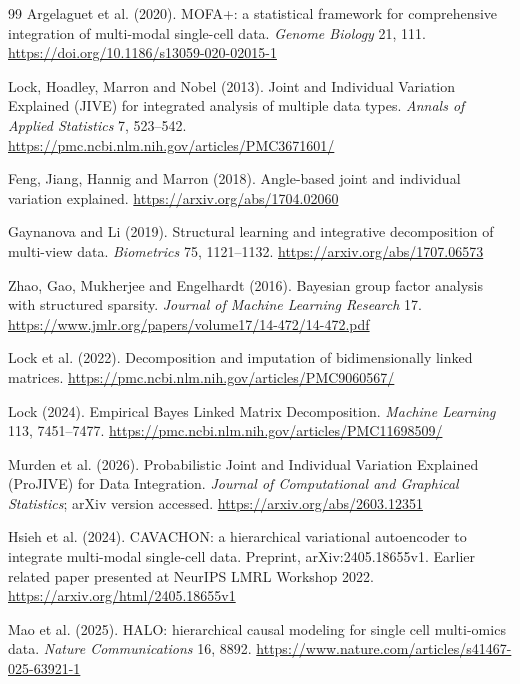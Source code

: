 \documentclass[11pt,a4paper]{article}
\numberwithin{equation}{section}
\begin{document}
\clearpage
\begingroup\small\raggedright
\begin{thebibliography}{99}
\setlength{\itemsep}{5pt}
Argelaguet et al. (2020).
MOFA+: a statistical framework for comprehensive integration of
multi-modal single-cell data. \emph{Genome Biology} 21, 111.
\url{https://doi.org/10.1186/s13059-020-02015-1}

Lock, Hoadley, Marron and Nobel (2013).
Joint and Individual Variation Explained (JIVE) for integrated analysis
of multiple data types. \emph{Annals of Applied Statistics} 7, 523--542.
\url{https://pmc.ncbi.nlm.nih.gov/articles/PMC3671601/}

Feng, Jiang, Hannig and Marron (2018).
Angle-based joint and individual variation explained.
\url{https://arxiv.org/abs/1704.02060}

Gaynanova and Li (2019).
Structural learning and integrative decomposition of multi-view data.
\emph{Biometrics} 75, 1121--1132.
\url{https://arxiv.org/abs/1707.06573}

Zhao, Gao, Mukherjee and Engelhardt (2016).
Bayesian group factor analysis with structured sparsity.
\emph{Journal of Machine Learning Research} 17.
\url{https://www.jmlr.org/papers/volume17/14-472/14-472.pdf}

Lock et al. (2022).
Decomposition and imputation of bidimensionally linked matrices.
\url{https://pmc.ncbi.nlm.nih.gov/articles/PMC9060567/}

Lock (2024).
Empirical Bayes Linked Matrix Decomposition.
\emph{Machine Learning} 113, 7451--7477.
\url{https://pmc.ncbi.nlm.nih.gov/articles/PMC11698509/}

Murden et al. (2026).
Probabilistic Joint and Individual Variation Explained (ProJIVE) for
Data Integration. \emph{Journal of Computational and Graphical Statistics};
arXiv version accessed.
\url{https://arxiv.org/abs/2603.12351}

Hsieh et al. (2024).
CAVACHON: a hierarchical variational autoencoder to integrate multi-modal
single-cell data. Preprint, arXiv:2405.18655v1.
Earlier related paper presented at NeurIPS LMRL Workshop 2022.
\url{https://arxiv.org/html/2405.18655v1}

Mao et al. (2025).
HALO: hierarchical causal modeling for single cell multi-omics data.
\emph{Nature Communications} 16, 8892.
\url{https://www.nature.com/articles/s41467-025-63921-1}


\end{thebibliography}
\end{document}

